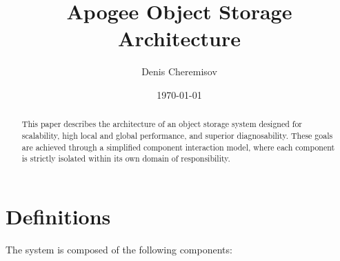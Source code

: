 \documentclass[a4paper,12pt]{article}
\title{Apogee Object Storage Architecture}
\author{Denis Cheremisov}
\date{\today}
\begin{document}
    \maketitle

    \begin{abstract}
        This paper describes the architecture of an object storage system designed for scalability, high local and
        global performance, and superior diagnosability. These goals are achieved through a simplified component
        interaction model, where each component is strictly isolated within its own domain of responsibility.
    \end{abstract}

    \newpage
    \tableofcontents

    \newpage  %


    \section{Definitions}

    The system is composed of the following components:
\end{document}
